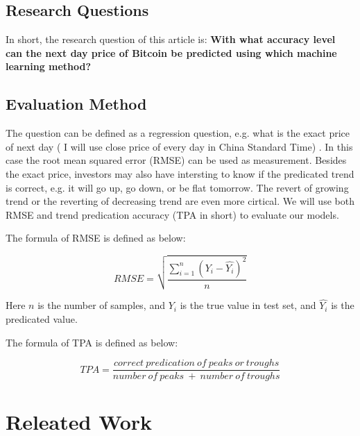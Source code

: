 \documentclass[10pt,twocolumn,letterpaper]{article}
\begin{document}
\subsection{Research Questions}

In short, the research question of this article is: { \bf With what accuracy level can the next day price 
of Bitcoin be predicted using which machine learning method? }



\subsection{Evaluation Method}

The question can be defined as a regression question, e.g. what is the exact price of next day ( I will use close price of every day in China Standard Time) . 
In this case the root mean squared error (RMSE) can be used as measurement. Besides the exact price, investors may also have intersting to know if the predicated trend is correct, 
e.g. it will go up, go down, or be flat tomorrow. The revert of growing trend or the reverting of decreasing trend are even more cirtical. We will use both RMSE and trend predication 
accuracy (TPA in short) to evaluate our models.

The formula of RMSE is defined as below: 

\par
\begin{equation*}
RMSE = \sqrt{\frac{\sum_{i=1}^{n}(Y_i - \hat{Y_i})^2  }{n}}
\end{equation*}

Here $ n $ is the number of samples, and $ Y_i $ is the true value in test set, and $\hat{Y_i}$ is the predicated value.

\par

The formula of TPA is defined as below:

\begin{equation*}
TPA = \frac{correct\ predication\ of\ peaks\ or\ troughs}{number\ of\ peaks\ +\ number\ of\ troughs } 
\end{equation*}




\section{Releated Work}
\end{document}
